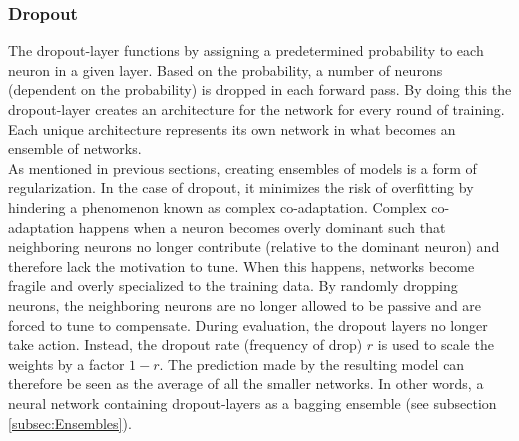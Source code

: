 \subsubsection*{Dropout}\label{subsubsec:Dropout}
The dropout-layer functions by assigning a predetermined probability to each neuron in a given layer. Based on the 
probability, a number of neurons (dependent on the probability) is dropped in each forward pass. By doing this the 
dropout-layer creates an architecture for the network for every round of training. Each unique architecture represents 
its own network in what becomes an ensemble of networks. 
\\
As mentioned in previous sections, creating ensembles of models is a form of regularization. In the case of 
dropout, it minimizes the risk of overfitting by hindering a phenomenon known as complex co-adaptation. Complex
co-adaptation happens when a neuron becomes overly dominant such that neighboring neurons no longer contribute (relative
to the dominant neuron) and therefore lack the motivation to tune. When this happens, networks become fragile and overly 
specialized to the training data. By randomly dropping neurons, the neighboring neurons are no longer allowed to be passive 
and are forced to tune to compensate. During evaluation, the dropout layers no longer take action. Instead, the dropout rate 
(frequency of drop) $r$ is used to scale the weights by a factor $1-r$. The prediction made by the resulting 
model can therefore be seen as the average of all the smaller networks. In other words, a neural network containing dropout-layers 
as a bagging ensemble (see subsection \ref{subsec:Ensembles}). 

